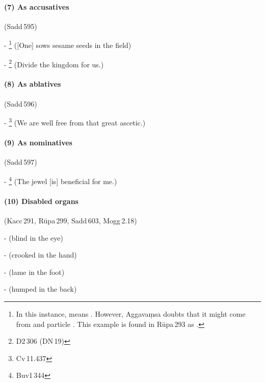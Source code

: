\paragraph*{(7) As accusatives} (Sadd\,595)\par
- \footnote{In this instance,  means . However, Aggava\d msa doubts that it might come from  and particle . This example is found in R\=upa\,293 as .} ([One] sows sesame seeds in the field)\par
- \footnote{D2\,306 (DN\,19)} (Divide the kingdom for us.)\par

\paragraph*{(8) As ablatives} (Sadd\,596)\par
- \footnote{Cv\,11.437} (We are well free from that great ascetic.)\par

\paragraph*{(9) As nominatives} (Sadd\,597)\par
- \footnote{Buv1\,344} (The jewel [is] beneficial for me.)\par

\paragraph*{(10) Disabled organs} (Kacc\,291, R\=upa\,299, Sadd\,603, Mogg\,2.18)\par
-  (blind in the eye)\par
-  (crooked in the hand)\par
-  (lame in the foot)\par
-  (humped in the back)\par

